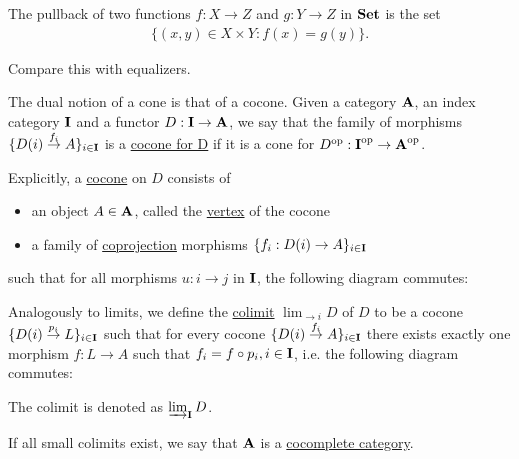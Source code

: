 \begin{example}\label{ex:categorical_pullback/set}
  The pullback of two functions $f: X \to Z$ and $g: Y \to Z$ in $\operatorname{\mathbf{Set}}$ is the set
  \begin{align*}
    \{ (x, y) \in X \times Y \colon f(x) = g(y) \}.
  \end{align*}

  Compare this with equalizers.
\end{example}

\begin{definition}\label{def:categorical_cocone}\cite[definition 5.2.1]{Leinster2014}
  The dual notion of a cone is that of a cocone. Given a category $\operatorname{\mathbf{A}}$, an index category $\operatorname{\mathbf{I}}$ and a functor $D: \operatorname{\mathbf{I}} \to \operatorname{\mathbf{A}}$, we say that the family of morphisms $\{ D(i) \overset {f_i} \to A \}_{i \in \operatorname{\mathbf{I}}}$ is a \uline{cocone for D} if it is a cone for $D^{\operatorname{op}}: \operatorname{\mathbf{I}}^{\operatorname{op}} \to \operatorname{\mathbf{A}}^{\operatorname{op}}$.

  Explicitly, a \uline{cocone} on $D$ consists of
  \begin{itemize}
    \item an object $A \in \operatorname{\mathbf{A}}$, called the \uline{vertex} of the cocone
    \item a family of \uline{coprojection} morphisms $\{ f_i: D(i) \to A \}_{i \in \operatorname{\mathbf{I}}}$
  \end{itemize}
  such that for all morphisms $u: i \to j$ in $\operatorname{\mathbf{I}}$, the following diagram commutes:
  \begin{center}
  \end{center}
\end{definition}

\begin{definition}\label{def:categorical_colimit}\cite[definition 5.1.19(b)]{Leinster2014}
  Analogously to limits, we define the \uline{colimit} $\displaystyle\lim_{\to i} D$ of $D$ to be a cocone $\{ D(i) \overset {p_i} \to L \}_{i \in \operatorname{\mathbf{I}}}$ such that for every cocone $\{ D(i) \overset {f_i} \to A \}_{i \in \operatorname{\mathbf{I}}}$ there exists exactly one morphism $f: L \to A$ such that $f_i = f \circ p_i, i \in \operatorname{\mathbf{I}}$, i.e. the following diagram commutes:
  \begin{center}
  \end{center}

  The colimit is denoted as $\varinjlim_{\operatorname{\mathbf{I}}} D$.

  If all small colimits exist, we say that $\operatorname{\mathbf{A}}$ is a \uline{cocomplete category}.
\end{definition}

